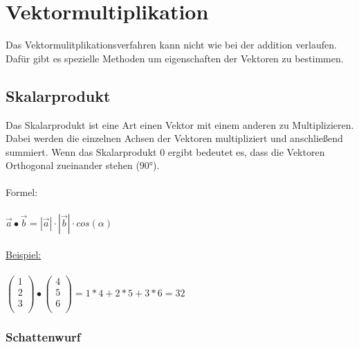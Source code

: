 
\section{Vektormultiplikation}
Das Vektormulitplikationsverfahren kann nicht wie bei der addition verlaufen. 
Dafür gibt es spezielle Methoden um eigenschaften der Vektoren zu bestimmen.

\subsection{Skalarprodukt}
Das Skalarprodukt ist eine Art einen Vektor mit einem anderen zu Multiplizieren.
Dabei werden die einzelnen Achsen der Vektoren multipliziert und anschließend summiert. 
Wenn das Skalarprodukt 0 ergibt bedeutet es, dass die Vektoren Orthogonal zueinander stehen (90°).
\\\\
Formel: \\\\
$
\vec{a} \bullet \vec{b} = |\vec{a}| \cdot |\vec{b}| \cdot cos(\alpha)
$
\\\\
\underline{Beispiel:} \\\\
$
\begin{pmatrix}
    1 \\ 
    2 \\ 
    3 \\
\end{pmatrix}
\bullet
\begin{pmatrix}
    4 \\
    5 \\
    6 \\
\end{pmatrix}
=
1 * 4 + 2 * 5 + 3 * 6
= 
32
$
\subsubsection{Schattenwurf}


